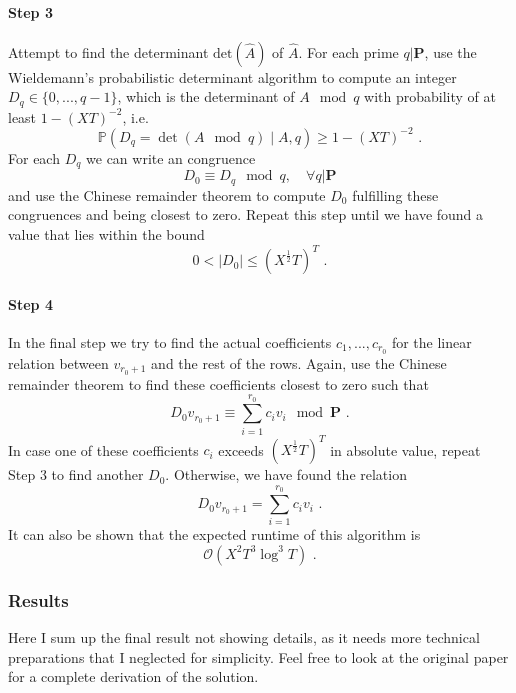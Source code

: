 \documentclass[paper=a4, fontsize=11pt]{scrartcl} %
\numberwithin{equation}{section} %
\numberwithin{figure}{section} %
\numberwithin{table}{section} %
\begin{document}
\paragraph{Step 3} Attempt to find the determinant $\mathrm{det}(\hat{A})$ of $\hat{A}$. For each prime $q|\boldsymbol{P}$, use the Wieldemann's probabilistic determinant algorithm \citep{wiedemann1986solving} to compute an integer $D_q\in\{0,...,q-1\}$, which is the determinant of $A\mod q$ with probability of at least $1-(XT)^{-2}$, i.e.
\begin{equation}
\mathbb{P}(D_q = \det(A\mod q)\mid A,q) \geq 1-(XT)^{-2}
\text{ .}
\end{equation}
For each $D_q$ we can write an congruence
\begin{equation}
D_0 \equiv D_q \mod q,\quad\forall q|\boldsymbol{P}
\end{equation}
and use the Chinese remainder theorem to compute $D_0$ fulfilling these congruences and being closest to zero. Repeat this step until we have found a value that lies within the bound
\begin{equation}
0 < |D_0| \leq (X^{\frac{1}{2}}T)^T
\text{ .}
\end{equation}

\paragraph{Step 4} In the final step we try to find the actual coefficients $c_1,...,c_{r_0}$ for the linear relation between $v_{r_0+1}$ and the rest of the rows. Again, use the Chinese remainder theorem to find these coefficients closest to zero such that
\begin{equation}
D_0v_{r_0+1}\equiv\sum_{i=1}^{r_0}c_iv_i\mod\boldsymbol{P}
\text{ .}
\end{equation}
In case one of these coefficients $c_i$ exceeds $(X^{\frac{1}{2}}T)^T$ in absolute value, repeat Step 3 to find another $D_0$. Otherwise, we have found the relation
\begin{equation}
D_0v_{r_0+1}=\sum_{i=1}^{r_0}c_iv_i
\text{ .}
\end{equation}
It can also be shown that the expected runtime of this algorithm is
\begin{equation}
\mathcal{O}(X^2T^3\log^3T)
\text{ .}
\end{equation}

\subsubsection{Results}
Here I sum up the final result not showing details, as it needs more technical preparations that I neglected for simplicity. Feel free to look at the original paper for a complete derivation of the solution.
\end{document}
